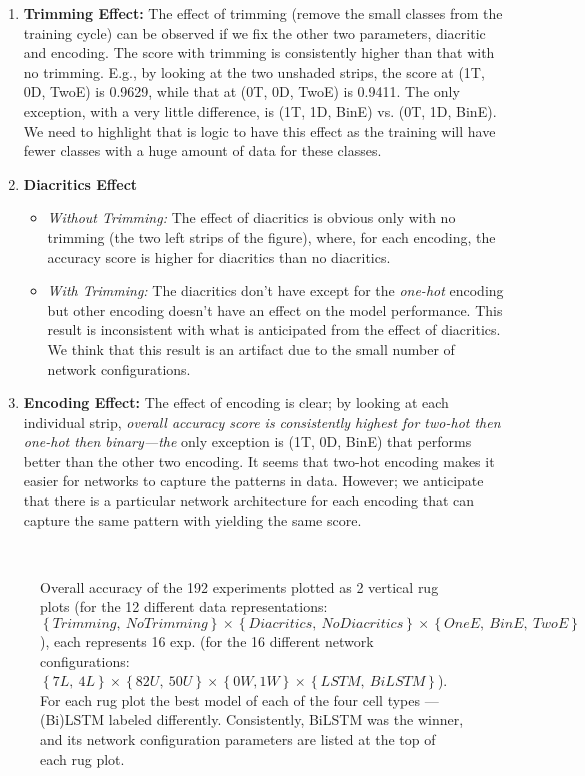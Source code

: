 \begin{enumerate}
\item \textbf{Trimming Effect:} The effect of trimming (remove the small classes from the training cycle) can be observed if we fix the other two parameters, diacritic and encoding. The score with trimming is consistently higher than that with no trimming. E.g., by looking at the two unshaded strips, the score at (1T, 0D, TwoE) is 0.9629, while that at (0T, 0D, TwoE) is 0.9411. The only exception, with a very little difference, is (1T, 1D, BinE) vs. (0T, 1D, BinE). We need to highlight that is logic to have this effect as the training will have fewer classes with a huge amount of data for these classes.
\item \textbf{Diacritics Effect}
  \begin{itemize}
  \item \textit{Without Trimming:} The effect of diacritics is obvious only with no trimming (the two left strips of the figure), where, for each encoding, the accuracy score is higher for diacritics than no diacritics.
    \item \textit{With Trimming:} The diacritics don't have except for the \textit{one-hot} encoding but other encoding doesn't have an effect on the model performance. This result is inconsistent with what is anticipated from the effect of diacritics. We think that this result is an artifact due to the small number of network configurations.

    \end{itemize} 
\item \textbf{Encoding Effect:} The effect of encoding is clear; by looking at each individual strip, \textit{overall accuracy score is consistently highest for two-hot then one-hot then binary—the} only exception is (1T, 0D, BinE) that performs better than the other two encoding. It seems that two-hot encoding makes it easier for networks to capture the patterns in data. However; we anticipate that there is a particular network architecture for each encoding that can capture the same pattern with yielding the same score.
  \end{enumerate}


  
\begin{figure}[!t]
 
 \caption{Overall accuracy of the 192 experiments plotted as 2 vertical rug plots (for the 12 different data representations: $\left\{\mathit{Trimming},\ \mathit{No Trimming} \right\} \times \left\{\mathit{Diacritics},\ \mathit{No Diacritics} \right\} \times \left\{\mathit{OneE},\ \mathit{BinE},\ \mathit{TwoE}\right\}$), each represents 16 exp. (for the 16 different network configurations: $\left\{7L,\ 4L\right\} \times \left\{82U,\ 50U\right\} \times \left\{0W, 1W\right\} \times \left\{LSTM,\ BiLSTM\right\}$). For each rug plot the best model of each of the four cell types ---(Bi)LSTM labeled differently. Consistently, BiLSTM  was the winner, and its network configuration parameters are listed at the top of each rug plot.}~\label{Fig:ArabicModelsResults}
\end{figure}


